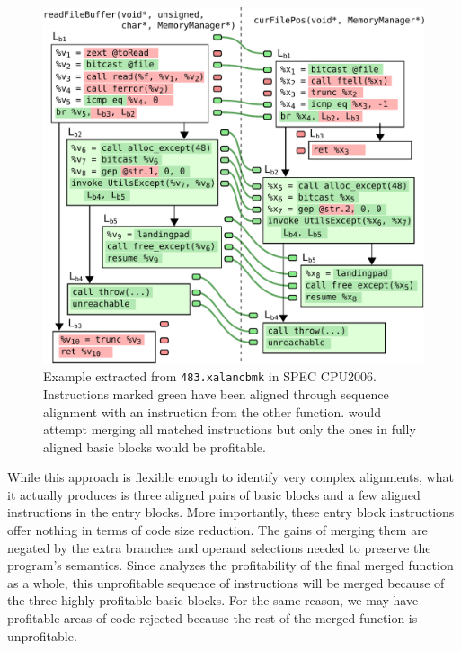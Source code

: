 \begin{figure}[h]
  \centering
  \includegraphics[width=\linewidth]{src/lctes21/figs/xalan-example.pdf}
  \caption{Example extracted from \texttt{483.xalancbmk} in SPEC CPU2006. Instructions marked green have been aligned through sequence alignment with an instruction from the other function. {\SOAName} would attempt merging all matched instructions but only the ones in fully aligned basic blocks would be profitable.}
  \label{fig:xalan-example}
\end{figure}


While this approach is flexible enough to identify very complex alignments, what it actually produces is three aligned pairs of basic blocks and a few aligned instructions in the entry blocks. More importantly, these entry block instructions offer nothing in terms of code size reduction. The gains of merging them are negated by the extra branches and operand selections needed to preserve the program's semantics. Since {\SOAName} analyzes the profitability of the final merged function as a whole, this unprofitable sequence of instructions will be merged because of the three highly profitable basic blocks. For the same reason, we may have profitable areas of code rejected because the rest of the merged function is unprofitable.


